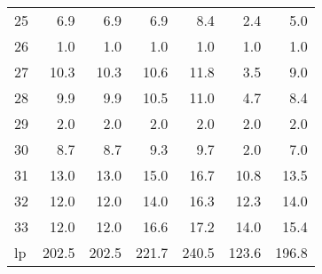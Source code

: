 \begin{tabular}{lrrrrrr}
     25 &   6.9 &   6.9 &   6.9 &   8.4 &   2.4 &   5.0 \\
     26 &   1.0 &   1.0 &   1.0 &   1.0 &   1.0 &   1.0 \\
     27 &  10.3 &  10.3 &  10.6 &  11.8 &   3.5 &   9.0 \\
     28 &   9.9 &   9.9 &  10.5 &  11.0 &   4.7 &   8.4 \\
     29 &   2.0 &   2.0 &   2.0 &   2.0 &   2.0 &   2.0 \\
     30 &   8.7 &   8.7 &   9.3 &   9.7 &   2.0 &   7.0 \\
     31 &  13.0 &  13.0 &  15.0 &  16.7 &  10.8 &  13.5 \\
     32 &  12.0 &  12.0 &  14.0 &  16.3 &  12.3 &  14.0 \\
     33 &  12.0 &  12.0 &  16.6 &  17.2 &  14.0 &  15.4 \\
     lp & 202.5 & 202.5 & 221.7 & 240.5 & 123.6 & 196.8 \\
\bottomrule
\end{tabular}
